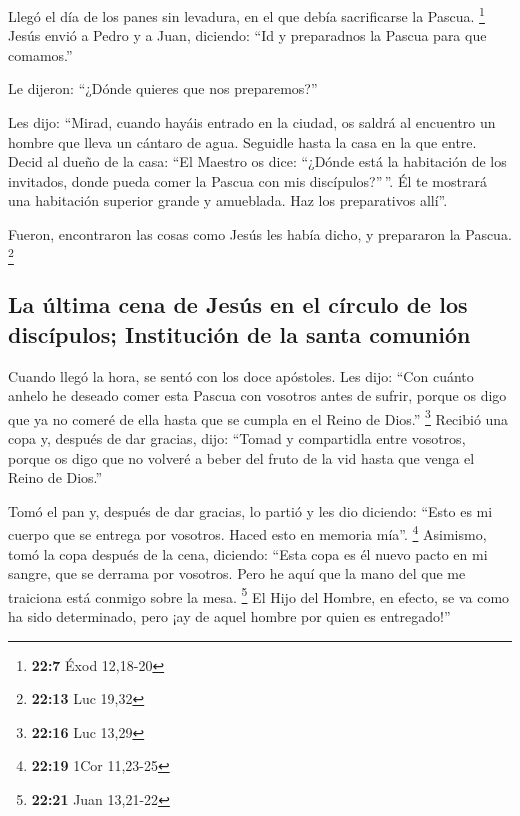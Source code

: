  Llegó el día de los panes sin levadura, en el que debía
sacrificarse la Pascua. \footnote{\textbf{22:7} Éxod 12,18-20}
 Jesús envió a Pedro y a Juan, diciendo: ``Id y
preparadnos la Pascua para que comamos.''

 Le dijeron: ``¿Dónde quieres que nos preparemos?''

 Les dijo: ``Mirad, cuando hayáis entrado en la ciudad,
os saldrá al encuentro un hombre que lleva un cántaro de agua. Seguidle
hasta la casa en la que entre.  Decid al dueño de la
casa: ``El Maestro os dice: ``¿Dónde está la habitación de los
invitados, donde pueda comer la Pascua con mis discípulos?''\,''.
 Él te mostrará una habitación superior grande y
amueblada. Haz los preparativos allí''.

 Fueron, encontraron las cosas como Jesús les había
dicho, y prepararon la Pascua. \footnote{\textbf{22:13} Luc 19,32}

\hypertarget{la-uxfaltima-cena-de-jesuxfas-en-el-cuxedrculo-de-los-discuxedpulos-instituciuxf3n-de-la-santa-comuniuxf3n}{%
\subsection{La última cena de Jesús en el círculo de los discípulos;
Institución de la santa
comunión}\label{la-uxfaltima-cena-de-jesuxfas-en-el-cuxedrculo-de-los-discuxedpulos-instituciuxf3n-de-la-santa-comuniuxf3n}}

 Cuando llegó la hora, se sentó con los doce apóstoles.
 Les dijo: ``Con cuánto anhelo he deseado comer esta
Pascua con vosotros antes de sufrir,  porque os digo que
ya no comeré de ella hasta que se cumpla en el Reino de Dios.''
\footnote{\textbf{22:16} Luc 13,29}  Recibió una copa y,
después de dar gracias, dijo: ``Tomad y compartidla entre vosotros,
 porque os digo que no volveré a beber del fruto de la
vid hasta que venga el Reino de Dios.''

 Tomó el pan y, después de dar gracias, lo partió y les
dio diciendo: ``Esto es mi cuerpo que se entrega por vosotros. Haced
esto en memoria mía''. \footnote{\textbf{22:19} 1Cor 11,23-25}
 Asimismo, tomó la copa después de la cena, diciendo:
``Esta copa es él nuevo pacto en mi sangre, que se derrama por vosotros.
 Pero he aquí que la mano del que me traiciona está
conmigo sobre la mesa. \footnote{\textbf{22:21} Juan 13,21-22}
 El Hijo del Hombre, en efecto, se va como ha sido
determinado, pero ¡ay de aquel hombre por quien es entregado!''

